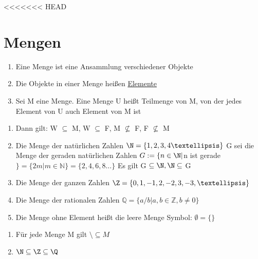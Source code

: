 <<<<<<< HEAD
\chapter{Mengen}
\Def
\begin{enumerate}
\item Eine Menge ist eine Ansammlung verschiedener Objekte
\item Die Objekte in einer Menge heißen \underline{Elemente}\\
%
%
\item Sei M eine Menge. Eine Menge U heißt Teilmenge von M, von der jedes Element von U auch Element von M ist\\
%
\end{enumerate}
%
\begin{enumerate}
\item {
Dann gilt: W $\subseteq$ M, W $\subseteq$ F, M ${\not\subseteq}$ F, F ${\not\subseteq}$ M}
\item {Die Menge der natürlichen Zahlen
$\N = \{1,2,3,4 …\}$
G sei die Menge der geraden natürlichen Zahlen
$G := \{n \in \N | $n ist gerade$\} = \{2m | m \in \mathds{N}\} = \{2,4,6,8 …\}$
Es gilt G $\subseteq \N, \N \subseteq$ G}
\item {Die Menge der ganzen Zahlen
$\Z = \{0,1,-1,2,-2,3,-3, …\}$}
\item {Die Menge der rationalen Zahlen
$\mathds{Q} = \{a/b | a, b \in \mathds{Z}, b \neq 0\}$}
\item {Die Menge ohne Element heißt die leere Menge
Symbol: $\emptyset = \{\}$}
\end{enumerate}
%
\bem
\begin{enumerate}
\item Für jede Menge M gilt $\setminus \subseteq M$
\item $\N \subseteq \Z \subseteq \Q$
\end{enumerate}

